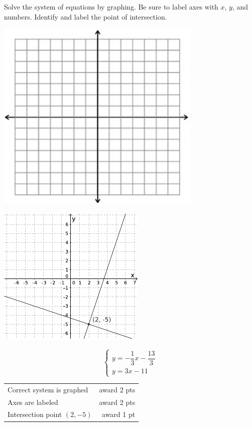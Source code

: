{
	Solve the system of equations by graphing. Be sure to label axes with $x$, $y$, and numbers. Identify and label the point of intersection. \begin{onlyproblem}\begin{center}\includegraphics{fig-graphpaper.png}\end{center}\end{onlyproblem} \begin{onlysolution}\begin{center}\includegraphics{fig095-10-5-c-answer}\end{center}\end{onlysolution}
	$$\begin{cases} y=-\dfrac{1}{3}x-\dfrac{13}{3}\\ y=3x-11\end{cases}$$
}
{
	\begin{tabular}{l r}
	Correct system is graphed & award 2 pts\\
	Axes are labeled & award 2 pts\\
	Intersection point $(2,-5)$ & award 1 pt
	\end{tabular}
}


